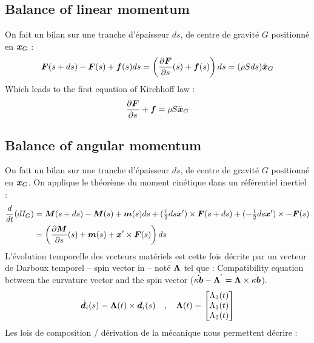 \subsection{Balance of linear momentum}
On fait un bilan sur une tranche d'épaisseur $ds$, de centre de gravité $G$ positionné en $\boldsymbol{x}_G$ :
\begin{equation}
	\boldsymbol{F}(s+ds)-\boldsymbol{F}(s) + \boldsymbol{f}(s)ds = \left(\frac{\partial \boldsymbol{F}}{\partial s}(s)+\boldsymbol{f}(s)\right)ds = (\rho Sds)\ddot{\boldsymbol{x}}_G
\end{equation}
Which leads to the first equation of Kirchhoff law :
\begin{equation}
	\frac{\partial \boldsymbol{F}}{\partial s}+\boldsymbol{f} = \rho S \ddot{\boldsymbol{x}}_G
\end{equation}

\subsection{Balance of angular momentum}
On fait un bilan sur une tranche d'épaisseur $ds$, de centre de gravité $G$ positionné en $\boldsymbol{x}_G$. On applique le théorème du moment cinétique dans un référentiel inertiel :
\begin{equation}
	\begin{aligned}
		\frac{d}{dt}(dI_G) &=
		\boldsymbol{M}(s+ds)-\boldsymbol{M}(s) + \boldsymbol{m}(s)ds
		+ (\tfrac{1}{2}ds\boldsymbol{x}')\times \boldsymbol{F}(s+ds) + (-\tfrac{1}{2}ds\boldsymbol{x}')\times -\boldsymbol{F}(s)\\
		&= \left(\frac{\partial \boldsymbol{M}}{\partial s}(s)+\boldsymbol{m}(s) + \boldsymbol{x}'\times \boldsymbol{F}(s)\right)ds
	\end{aligned}
\end{equation}
L'évolution temporelle des vecteurs matériels est cette fois décrite par un vecteur de Darboux temporel -- spin vector in \cite{Coleman1993} -- noté $\boldsymbol{\Lambda}$ tel que :
Compatibility equation between the curvature vector and the spin vector ($\dot{\kappa\boldsymbol{b}} - \boldsymbol{\Lambda}^{'} = \boldsymbol{\Lambda} \times \kappa\boldsymbol{b}$).
\begin{equation}
	\dot{\boldsymbol{d}_{i}}(s) =\boldsymbol{\Lambda}(t) \times \boldsymbol{d}_i(s)	\quad,\quad
	\boldsymbol{\Lambda}(t)
	=
	\begin{bmatrix}
		\Lambda_3(t) \\
		\Lambda_1(t) \\
		\Lambda_2(t)
	\end{bmatrix}
\end{equation}
Les lois de composition / dérivation de la mécanique nous permettent décrire :
